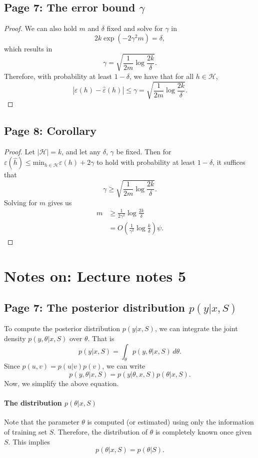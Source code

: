 \documentclass{article}
\begin{document}
\subsection{Page 7: The error bound $\gamma$}
\begin{proof}
We can also hold $m$ and $\delta$ fixed and solve for $\gamma$ in
\[
2k\exp(-2\gamma^2m)= \delta,
\]
which results in
\[
\gamma= \sqrt{\frac{1}{2m}\log\frac{2k}{\delta}}.
\]
Therefore, with probability at least $1-\delta$, we have that for all $h\in \mathcal{H}$,
\[
|\varepsilon(h)-\hat{\varepsilon}(h)|\leq \gamma =\sqrt{\frac{1}{2m}\log\frac{2k}{\delta}}.
\]
\end{proof}


\subsection{Page 8: Corollary}
\begin{proof}
Let $|\mathcal{H}|=k$, and let any $\delta$, $\gamma$ be fixed. Then for $\varepsilon(\hat{h})\leq \text{min}_{h\in\mathcal{H}}\varepsilon(h)+2\gamma$ to hold with probability at least $1-\delta$, it suffices that
\[
\gamma\geq \sqrt{\frac{1}{2m}\log\frac{2k}{\delta}}.
\]
Solving for $m$ gives us
\[
\begin{split}
m &\geq \frac{1}{2\gamma^2}\log\frac{2k}{\delta}\\
& = O\left(\frac{1}{\gamma^2}\log\frac{k}{\delta}\right)\psi.
\end{split}
\]
\end{proof}

\section{Notes on: Lecture notes 5}
\subsection{Page 7: The posterior distribution $p(y|x,S)$}
To compute the posterior distribution $p(y|x,S)$, we can integrate the joint density $p(y,\theta|x,S)$ over $\theta$. That is
\[
p(y|x,S)=\int_{\theta} p(y,\theta|x,S)\, d\theta.
\]
Since $p(u,v)=p(u|v)p(v)$, we can write
\[
p(y,\theta|x,S) = p(y|\theta,x,S)p(\theta|x,S).
\]
Now, we simplify the above equation.
\paragraph{The distribution $p(\theta|x,S)$} Note that the parameter $\theta$ is computed (or estimated) using only the information of training set $S$. Therefore, the distribution of $\theta$ is completely known once given $S$. This implies
\[
p(\theta|x,S)=p(\theta|S).
\]
\end{document}
